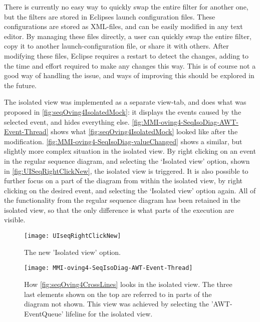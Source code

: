 There is currently no easy way to quickly swap the entire filter for another one, but the filters are stored in Eclipses launch configuration files.
These configurations are stored as XML-files, and can be easily modified in any text editor.
By managing these files directly, a user can quickly swap the entire filter, copy it to another launch-configuration file, or share it with others.
After modifying these files, Eclipse requires a restart to detect the changes, adding to the time and effort required to make any changes this way.
This is of course not a good way of handling the issue, and ways of improving this should be explored in the future.

The isolated view was implemented as a separate view-tab, and does what was proposed in \autoref{fig:seqOving4IsolatedMock}: it displays the events caused by the selected event, and hides everything else.
\autoref{fig:MMI-oving4-SeqIsoDiag-AWT-Event-Thread} shows what \autoref{fig:seqOving4IsolatedMock} looked like after the modification.
\autoref{fig:MMI-oving4-SeqIsoDiag-valueChanged} shows a similar, but slightly more complex situation in the isolated view.
By right clicking on an event in the regular sequence diagram, and selecting the `Isolated view' option, shown in \autoref{fig:UISeqRightClickNew}, the isolated view is triggered.
It is also possible to further focus on a part of the diagram from within the isolated view, by right clicking on the desired event, and selecting the `Isolated view' option again.
All of the functionality from the regular sequence diagram has been retained in the isolated view, so that the only difference is what parts of the execution are visible.
\begin{figure}[H]
	\centering
	\texttt{[image: UIseqRightClickNew]}
	\caption{The new 'Isolated view' option.}
	\label{fig:UISeqRightClickNew}
\end{figure}

\begin{figure}[H]
	\centering
	\texttt{[image: MMI-oving4-SeqIsoDiag-AWT-Event-Thread]}
	\caption[How \autoref{fig:seqOving4CrossLines} looks in the isolated view.]{How \autoref{fig:seqOving4CrossLines} looks in the isolated view. The three last elements shown on the top are referred to in parts of the diagram not shown. This view was achieved by selecting the 'AWT-EventQueue' lifeline for the isolated view.}
	\label{fig:MMI-oving4-SeqIsoDiag-AWT-Event-Thread}
\end{figure}

